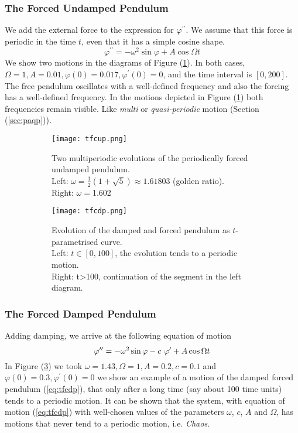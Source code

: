 \subsubsection{The Forced Undamped Pendulum}
We add the external force to the expression for $\varphi^{\prime\prime}$.
We assume that this force is periodic in the time $t$, even that it has a simple cosine shape.
\begin{equation}
	\varphi^{\prime\prime}=-\omega^2\sin\varphi+A\cos\Omega t
\end{equation}
We show two motions in the diagrams of Figure (\ref{fig:tfcup}).
In both cases, $\Omega=1, A=0.01, \varphi(0)=0.017, \varphi^\prime(0)=0$, and the time interval is $[0,200]$.
The free pendulum oscillates with a well-defined frequency and also the forcing has a well-defined frequency.
In the motions depicted in Figure (\ref{fig:tfcup}) both frequencies remain visible. Like \emph{multi} or \emph{quasi}\emph{-periodic} motion (Section (\ref{sec:paqp})). 
\begin{figure}[h!]
	\centering
	\begin{subfigure}{0.45\linewidth}
		\centering
		\texttt{[image: tfcup.png]}
		\caption{Two multiperiodic evolutions of the periodically forced undamped pendulum.\\
		Left: $\omega=\frac{1}{2}(1+\sqrt{5})\approx1.61803$ (golden ratio).\\
		Right: $\omega=$1.602}
		\label{fig:tfcup}
	\end{subfigure}
	\vline
	\begin{subfigure}{0.52\linewidth}
		\centering
		\texttt{[image: tfcdp.png]}
		\caption{Evolution of the damped and forced pendulum as $t$-parametrised curve.\\
		Left: $t\in[0,100]$, the evolution tends to a periodic motion.\\
		Right: t>100, continuation of the segment in the left diagram.}
		\label{fig:tfcdp}
	\end{subfigure}
	\caption{}
\end{figure}
\subsubsection{The Forced Damped Pendulum}
Adding damping, we arrive at the following equation of motion
\begin{equation}{\label{eq:tfcdp}}
	\varphi^{\prime\prime}=-\omega^2\sin\varphi-c\ \varphi^\prime+A\cos\Omega t
\end{equation}
In Figure (\ref{fig:tfcdp}) we took $\omega=1.43, \Omega=1, A=0.2, c=0.1$ and $\varphi(0)=0.3, \varphi^\prime(0)=0$ we show an example of a motion of the damped forced pendulum (\ref{eq:tfcdp}), that only after a long time (say about 100 time units) tends to a periodic motion. 
It can be shown that the system, with equation of motion (\ref{eq:tfcdp}) with well-chosen values of the parameters $\omega$, $c$, $A$ and $\Omega$, has motions that never tend to a periodic motion, i.e. \emph{Chaos}.